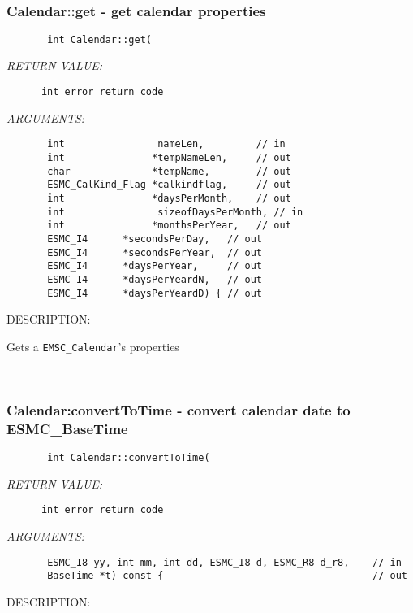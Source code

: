  
\mbox{}\hrulefill\ 
 
\subsubsection [Calendar::get] {Calendar::get - get calendar properties}


  
\begin{verbatim}       int Calendar::get(\end{verbatim}{\em RETURN VALUE:}
\begin{verbatim}      int error return code\end{verbatim}{\em ARGUMENTS:}
\begin{verbatim}       int                nameLen,         // in
       int               *tempNameLen,     // out
       char              *tempName,        // out
       ESMC_CalKind_Flag *calkindflag,     // out
       int               *daysPerMonth,    // out
       int                sizeofDaysPerMonth, // in
       int               *monthsPerYear,   // out
       ESMC_I4      *secondsPerDay,   // out
       ESMC_I4      *secondsPerYear,  // out
       ESMC_I4      *daysPerYear,     // out
       ESMC_I4      *daysPerYeardN,   // out
       ESMC_I4      *daysPerYeardD) { // out
   \end{verbatim}
{\sf DESCRIPTION:\\ }


        Gets a {\tt EMSC\_Calendar}'s properties
    
 
\mbox{}\hrulefill\ 
 
\subsubsection [Calendar:convertToTime] {Calendar:convertToTime - convert calendar date to ESMC\_BaseTime}


  
\begin{verbatim}       int Calendar::convertToTime(\end{verbatim}{\em RETURN VALUE:}
\begin{verbatim}      int error return code\end{verbatim}{\em ARGUMENTS:}
\begin{verbatim}       ESMC_I8 yy, int mm, int dd, ESMC_I8 d, ESMC_R8 d_r8,    // in
       BaseTime *t) const {                                    // out\end{verbatim}
{\sf DESCRIPTION:\\ }


